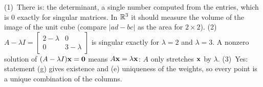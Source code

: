 \documentclass[11pt]{article}
\begin{document}
\begin{description}[leftmargin=0pt,itemsep=5pt]
  \item[Before the next section.] (1)~There is: the determinant, a single number computed from the entries, which is $0$ exactly for singular matrices. In $\mathbb{R}^3$ it should measure the volume of the image of the unit cube (compare $|ad-bc|$ as the area for $2\times2$). (2)~$A-\lambda I=\begin{bmatrix}2-\lambda&0\\0&3-\lambda\end{bmatrix}$ is singular exactly for $\lambda=2$ and $\lambda=3$. A nonzero solution of $(A-\lambda I)\mathbf{x}=\mathbf{0}$ means $A\mathbf{x}=\lambda\mathbf{x}$: $A$ only stretches $\mathbf{x}$ by $\lambda$. (3)~Yes: statement (g) gives existence and (e) uniqueness of the weights, so every point is a unique combination of the columns.
\end{description}
\end{document}
